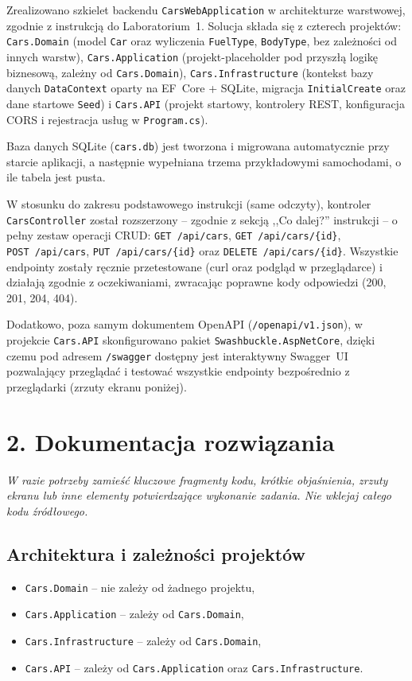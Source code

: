 \documentclass[11pt,a4paper]{article}
\begin{document}
\begin{tcolorbox}[breakable,colback=gray!2,colframe=gray!25,boxrule=0.5pt,arc=1mm]
Zrealizowano szkielet backendu \texttt{CarsWebApplication} w architekturze warstwowej, zgodnie z instrukcją do Laboratorium~1. Solucja składa się z czterech projektów: \texttt{Cars.Domain} (model \texttt{Car} oraz wyliczenia \texttt{FuelType}, \texttt{BodyType}, bez zależności od innych warstw), \texttt{Cars.Application} (projekt-placeholder pod przyszłą logikę biznesową, zależny od \texttt{Cars.Domain}), \texttt{Cars.Infrastructure} (kontekst bazy danych \texttt{DataContext} oparty na EF~Core + SQLite, migracja \texttt{InitialCreate} oraz dane startowe \texttt{Seed}) i \texttt{Cars.API} (projekt startowy, kontrolery REST, konfiguracja CORS i rejestracja usług w \texttt{Program.cs}).

Baza danych SQLite (\texttt{cars.db}) jest tworzona i migrowana automatycznie przy starcie aplikacji, a następnie wypełniana trzema przykładowymi samochodami, o ile tabela jest pusta.

W stosunku do zakresu podstawowego instrukcji (same odczyty), kontroler \texttt{CarsController} został rozszerzony -- zgodnie z sekcją ,,Co dalej?'' instrukcji -- o pełny zestaw operacji CRUD: \texttt{GET~/api/cars}, \texttt{GET~/api/cars/\{id\}}, \texttt{POST~/api/cars}, \texttt{PUT~/api/cars/\{id\}} oraz \texttt{DELETE~/api/cars/\{id\}}. Wszystkie endpointy zostały ręcznie przetestowane (curl oraz podgląd w przeglądarce) i działają zgodnie z oczekiwaniami, zwracając poprawne kody odpowiedzi (200, 201, 204, 404).

Dodatkowo, poza samym dokumentem OpenAPI (\texttt{/openapi/v1.json}), w projekcie \texttt{Cars.API} skonfigurowano pakiet \texttt{Swashbuckle.AspNetCore}, dzięki czemu pod adresem \texttt{/swagger} dostępny jest interaktywny Swagger~UI pozwalający przeglądać i testować wszystkie endpointy bezpośrednio z przeglądarki (zrzuty ekranu poniżej).
\end{tcolorbox}

\section*{\color{PSblue}2. Dokumentacja rozwiązania}
{\small\color{PSgray}\textit{W razie potrzeby zamieść kluczowe fragmenty kodu, krótkie objaśnienia, zrzuty ekranu lub inne elementy potwierdzające wykonanie zadania. Nie wklejaj całego kodu źródłowego.}}

\subsection*{Architektura i zależności projektów}
\begin{itemize}[nosep]
    \item \texttt{Cars.Domain} -- nie zależy od żadnego projektu,
    \item \texttt{Cars.Application} -- zależy od \texttt{Cars.Domain},
    \item \texttt{Cars.Infrastructure} -- zależy od \texttt{Cars.Domain},
    \item \texttt{Cars.API} -- zależy od \texttt{Cars.Application} oraz \texttt{Cars.Infrastructure}.
\end{itemize}
\end{document}
